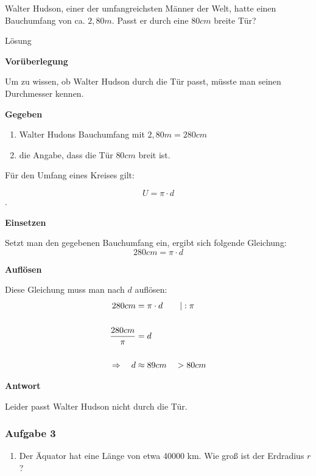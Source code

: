 \documentclass[
  ngerman,
]{book}
\providecommand{\tightlist}{%
  \setlength{\itemsep}{0pt}\setlength{\parskip}{0pt}}
\begin{document}
Walter Hudson, einer der umfangreichsten Männer der Welt, hatte einen Bauchumfang von ca. \(2,80 m\). Passt er durch eine \(80 cm\) breite Tür?

Lösung

\textbf{Vorüberlegung}

Um zu wissen, ob Walter Hudson durch die Tür passt, müsste man seinen Durchmesser kennen.

\textbf{Gegeben}

\begin{enumerate}
\def\labelenumi{\arabic{enumi}.}
\tightlist
\item
  Walter Hudons Bauchumfang mit \(2,80m = 280cm\)
\item
  die Angabe, dass die Tür \(80 cm\) breit ist.
\end{enumerate}

Für den Umfang eines Kreises gilt:

\[ U = \pi \cdot d\].

\textbf{Einsetzen}

Setzt man den gegebenen Bauchumfang ein, ergibt sich folgende Gleichung:
\[ 280 cm = \pi \cdot d \]

\textbf{Auflösen}

Diese Gleichung muss man nach \(d\) auflösen:
\[\begin{align} 280 cm &= \pi \cdot d \quad\quad | : \pi\\
{}\\
{280cm \over \pi } &= d\\
{}\\
\Rightarrow \quad d &\approx 89 cm \quad > 80 cm
\end{align}\]

\textbf{Antwort}

Leider passt Walter Hudson nicht durch die Tür.

\hypertarget{section-29}{%
\subsubsection*{}\label{section-29}}

\hypertarget{aufgabe-3-5}{%
\subsubsection*{Aufgabe 3}\label{aufgabe-3-5}}

\begin{enumerate}
\def\labelenumi{\alph{enumi})}
\tightlist
\item
  Der Äquator hat eine Länge von etwa 40000 km. Wie groß ist der Erdradius \(r\)?
\end{enumerate}
\end{document}
